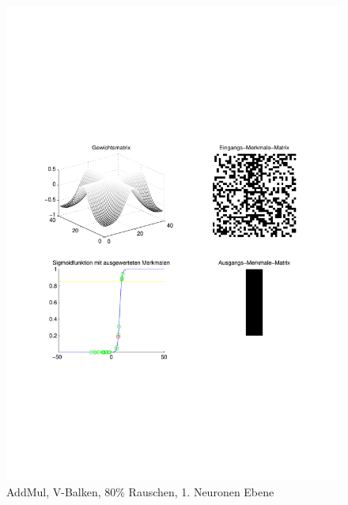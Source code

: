 \begin{figure}[hbt]
	\begin{minipage}{0.8 \textwidth}
		\includegraphics[width=\textwidth]{./Bilder/Auswertung/Endergebnis/TypeAddMul_Rauschen80_V_Line_Layer1}
		\caption{AddMul, V-Balken, 80\% Rauschen, 1. Neuronen Ebene}
		\label{AddMul_V_80_1}
	\end{minipage}
	\vfill
	\begin{minipage}{0.8 \textwidth}

\end{minipage}
\end{figure}
